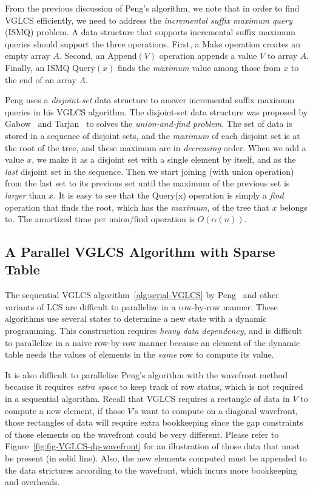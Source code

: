 From the previous discussion of Peng's algorithm, we note that in order
to find VGLCS efficiently, we need to address the {\em incremental
suffix maximum query} (ISMQ) problem.  A data structure that supports
incremental suffix maximum queries should support the three operations.
First, a {\sc Make} operation creates an empty array $A$. Second, an
{\sc Append}$(V)$ operation appends a value $V$ to array $A$. Finally, an
ISMQ {\sc Query}$(x)$ finds the {\em maximum} value among those from $x$
to the end of an array $A$.

Peng uses a {\em disjoint-set} data structure to answer incremental
suffix maximum queries in his VGLCS algorithm.  The disjoint-set data
structure was proposed by Gabow~\cite{Gabow1983ALA} and
Tarjan~\cite{Tarjan1975EfficiencyOA} to solves the {\em union-and-find
problem}.  The set of data is stored in a sequence of disjoint sets, and
the {\em maximum} of each disjoint set is at the root of the tree, and
these maximum are in {\em decreasing} order.  When we add a value $x$,
we make it as a disjoint set with a single element by itself, and as the
{\em last} disjoint set in the sequence.  Then we start joining (with
union operation) from the last set to its previous set until the maximum
of the previous set is {\em larger} than $x$. It is easy to see that the
{\sc Query(x)} operation is simply a {\em find} operation that finds the
root, which has the {\em maximum}, of the tree that $x$ belongs to.  The
amortized time per union/find operation is $O(\alpha(n))$.

\subsection{A Parallel VGLCS Algorithm with Sparse Table}

The sequential VGLCS algorithm~\ref{alg:serial-VGLCS} by
Peng~\cite{Peng2011TheLC} and other variants of LCS are difficult to
parallelize in a row-by-row manner.  These algorithms use several
states to determine a new state with a dynamic programming.  This
construction requires {\em heavy data dependency}, and is difficult to
parallelize in a naive row-by-row manner because an element of the
dynamic table needs the values of elements in the {\em same} row to
compute its value.

It is also difficult to parallelize Peng's algorithm with the wavefront
method because it requires {\em extra space} to keep track of row
status, which is not required in a sequential algorithm. Recall that
VGLCS requires a rectangle of data in $V$ to compute a new element, if
those $V$'s want to compute on a diagonal wavefront, those rectangles of
data will require extra bookkeeping since the gap constraints of those
elements on the wavefront could be very different.  Please refer to
Figure~\ref{fig:fig-VGLCS-dp-wavefront} for an illustration of those
data that must be present (in solid line).  Also, the new elements
computed must be appended to the data strictures according to the
wavefront, which incurs more bookkeeping and overheads.

